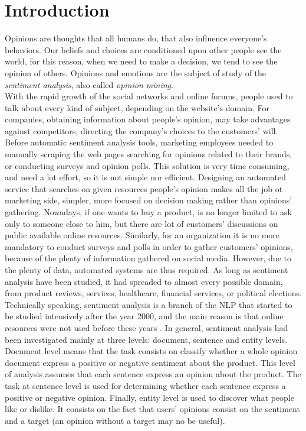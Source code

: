 \chapter{Introduction}
\label{introduction}

Opinions are thoughts that all humans do, that also influence everyone's behaviors. Our beliefs and choices are conditioned upon other people see the world, for this reason, when we need to make a decision, we tend to see the opinion of others. Opinions and emotions are the subject of study of the \textit{sentiment analysis}, also called \textit{opinion mining}.\\
With the rapid growth of the social networks and online forums, people used to talk about every kind of subject, depending on the website's domain. For companies, obtaining information about people's opinion, may take advantages against competitors, directing the company's choices to the customers' will. Before automatic sentiment analysis tools, marketing employees needed to manually scraping the web pages searching for opinions related to their brands, or conducting surveys and opinion polls. This solution is very time consuming, and need a lot effort, so it is not simple nor efficient. Designing an automated service that searches on given resources people's opinion makes all the job ot marketing side, simpler, more focused on decision making rather than opinions' gathering. Nowadays, if one wants to buy a product, is no longer limited to ask only to someone close to him, but there are lot of customers' discussions on public available online resources. Similarly, for an organization it is no more mandatory to conduct surveys and polls in order to gather customers' opinions, because of the plenty of information gathered on social media. However, due to the plenty of data, automated systems are thus required. As long as sentiment analysis have been studied, it had spreaded to almost every possible domain, from product reviews, services, healthcare, financial services, or political elections.\\
Technically speaking, sentiment analysis is a branch of the \ac{NLP} that started to be studied intensively after the year 2000, and the main reason is that online resources were not used before these years \cite{Liu:2012:SAO:3019323}. In general, sentiment analysis had been investigated mainly at three levels: document, sentence and entity levels. Document level means that the task consists on classify whether a whole opinion document express a positive or negative sentiment about the product. This level of analysis assumes that each sentence express an opinion about the product.  The task at sentence level is used for determining whether each sentence express a positive or negative opinion. Finally, entity level is used to discover what people like or dislike. It consists on the fact that users' opinions consist on the sentiment and a target (an opinion without a target may no be useful).\\
